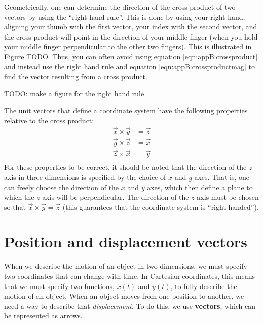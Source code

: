 Geometrically, one can determine the direction of the cross product of two vectors by using the ``right hand rule''. This is done by using your right hand, aligning your thumb with the first vector, your index with the second vector, and the cross product will point in the direction of your middle finger (when you hold your middle finger perpendicular to the other two fingers). This is illustrated in Figure TODO. Thus, you can often avoid using equation \ref{eqn:appB:crossproduct} and instead use the right hand rule and equation \ref{eqn:appB:crossproductmag} to find the vector resulting from a cross product.

TODO: make a figure for the right hand rule

The unit vectors that define a coordinate system have the following properties relative to the cross product:
\begin{align*}
\vec x \times \vec y &= \vec z\\
\vec y \times \vec z &= \vec x\\
\vec z \times \vec x &= \vec y\\
\end{align*}
For these properties to be correct, it should be noted that the direction of the $z$ axis in three dimensions is specified by the choice of $x$ and $y$ axes. That is, one can freely choose the direction of the $x$ and $y$ axes, which then define a plane to which the $z$ axis will be perpendicular. The direction of the $z$ axis must be chosen so that $\vec x \times \vec y = \vec z$ (this guarantees that the coordinate system is ``right handed''). 








\section{Position and displacement vectors}
When we describe the motion of an object in two dimensions, we must specify two coordinates that can change with time. In Cartesian coordinates, this means that we must specify two functions, $x(t)$ and $y(t)$, to fully describe the motion of an object. When an object moves from one position to another, we need a way to describe that \textit{displacement}. To do this, we use \textbf{vectors}, which can be represented as arrows.

